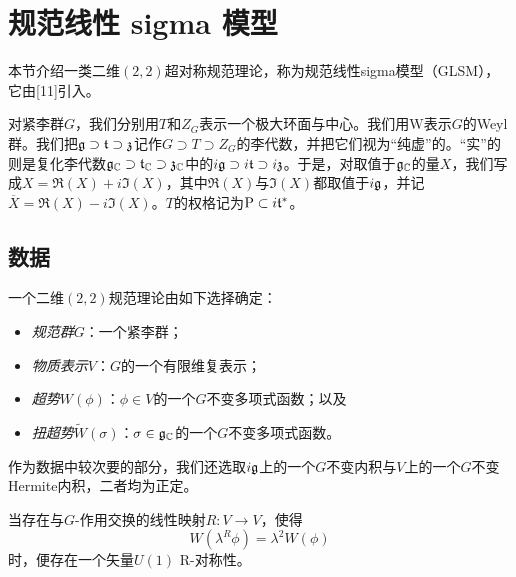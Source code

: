 \section{规范线性 sigma 模型}

本节介绍一类二维$(2,2)$超对称规范理论，称为规范线性sigma模型（GLSM），它由[11]引入。

对紧李群$G$，我们分别用$T$和$Z_G$表示一个极大环面与中心。我们用$\mathrm{W}$表示$G$的Weyl群。我们把$\mathfrak{g}\supset\mathfrak{t}\supset\mathfrak{z}$记作$G\supset T\supset Z_G$的李代数，并把它们视为“纯虚”的。“实”的则是复化李代数$\mathfrak{g}_{\mathbb{C}}\supset\mathfrak{t}_{\mathbb{C}}\supset\mathfrak{z}_{\mathbb{C}}$中的$i\mathfrak{g}\supset i\mathfrak{t}\supset i\mathfrak{z}$。于是，对取值于$\mathfrak{g}_{\mathbb{C}}$的量$X$，我们写成$X=\Re(X)+i\Im(X)$，其中$\Re(X)$与$\Im(X)$都取值于$i\mathfrak{g}$，并记$\overline{X}=\Re(X)-i\Im(X)$。$T$的权格记为$\mathrm{P}\subset i\mathfrak{t}^*$。


\subsection{数据}

一个二维$(2,2)$规范理论由如下选择确定：

\begin{itemize}
  \item \emph{规范群}$G$：一个紧李群；
  \item \emph{物质表示}$V$：$G$的一个有限维复表示；
  \item \emph{超势}$W(\phi)$：$\phi\in V$的一个$G$不变多项式函数；以及
  \item \emph{扭超势}$\widetilde{W}(\sigma)$：$\sigma\in\mathfrak{g}_{\mathbb{C}}$的一个$G$不变多项式函数。
\end{itemize}

作为数据中较次要的部分，我们还选取$i\mathfrak{g}$上的一个$G$不变内积与$V$上的一个$G$不变Hermite内积，二者均为正定。


当存在与$G$-作用交换的线性映射$R:V\to V$，使得
\begin{equation}
W(\lambda^R\phi)=\lambda^2W(\phi)
\tag{4.1}
\end{equation}
时，便存在一个矢量$U(1)$ R-对称性。

